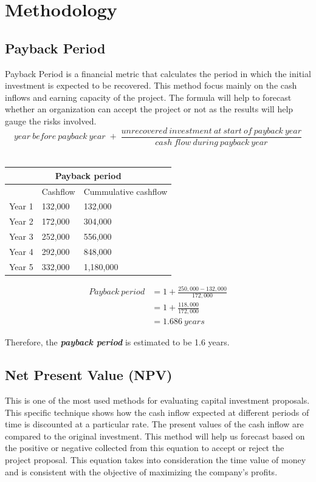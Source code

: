 \documentclass{article}
\begin{document}
\section{Methodology}
\blindtext
\subsection{Payback Period}
Payback Period is a financial metric that calculates the period in which the initial investment is expected to be recovered. This method focus mainly on the cash inflows and earning capacity of the project. The formula will help to forecast whether an organization can accept the project or not as the results will help gauge the risks involved.\\

$$year\:before\:payback\:year\; +\; \frac{unrecovered\:investment\:at\:start\:of\:payback\:year}{cash\:flow\:during\:payback\:year}$$ \\

\begin{center}
\begin{tabular}{ |p{2cm}|p{3cm}|p{4cm}| }
 \hline
 \multicolumn{3}{|c|}{\textbf{Payback period}} \\
 \hline
  &Cashflow &Cummulative cashflow\\
 \hline
 Year 1   & 132,000    & 132,000\\
 Year 2   & 172,000    & 304,000\\
 Year 3   & 252,000    & 556,000\\
 Year 4   & 292,000    & 848,000\\
 Year 5   & 332,000    & 1,180,000\\
 \hline
\end{tabular}
\end{center}

\begin{equation*}
\begin{split}
Payback\:period &= 1 +\frac{250,000 - 132,000}{172,000} \\
 &= 1 +\frac{118,000}{172,000} \\
 &= 1.686\:years
\end{split}
\end{equation*}

Therefore, the \textit{\textbf{payback period}} is estimated to be 1.6 years. 

\subsection{Net Present Value (NPV)}
This is one of the most used methods for evaluating capital investment proposals. This specific technique shows how the cash inflow expected at different periods of time is discounted at a particular rate. The present values of the cash inflow are compared to the original investment. This method will help us forecast based on the positive or negative collected from this equation to accept or reject the project proposal. This equation takes into consideration the time value of money and is consistent with the objective of maximizing the company's profits.\\
\end{document}
